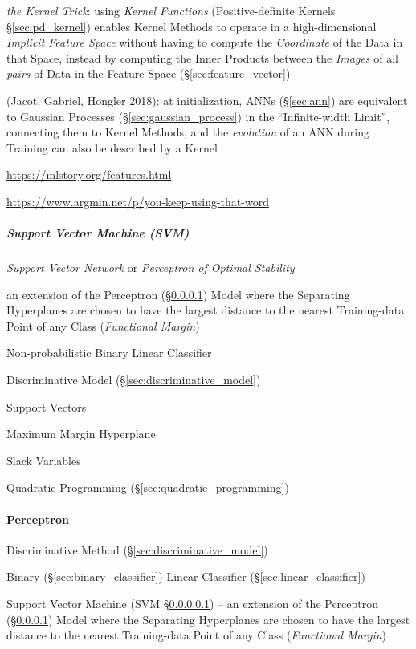 \emph{the Kernel Trick}: using \emph{Kernel Functions} (Positive-definite
Kernels \S\ref{sec:pd_kernel}) enables Kernel Methods to operate in a
high-dimensional \emph{Implicit Feature Space} without having to compute the
\emph{Coordinate} of the Data in that Space, instead by computing the Inner
Products between the \emph{Images} of all \emph{pairs} of Data in the Feature
Space (\S\ref{sec:feature_vector})

(Jacot, Gabriel, Hongler 2018): at initialization, ANNs (\S\ref{sec:ann}) are
equivalent to Gaussian Processes (\S\ref{sec:gaussian_process}) in the
``Infinite-width Limit'', connecting them to Kernel Methods, and the
\emph{evolution} of an ANN during Training can also be described by a Kernel

\url{https://mlstory.org/features.html}

\url{https://www.argmin.net/p/you-keep-using-that-word}



\subparagraph{Support Vector Machine (SVM)}\label{sec:svm}\hfill

\emph{Support Vector Network} or \emph{Perceptron of Optimal Stability}

an extension of the Perceptron (\S\ref{sec:perceptron}) Model where the
Separating Hyperplanes are chosen to have the largest distance to the nearest
Training-data Point of any Class (\emph{Functional Margin})

Non-probabilistic Binary Linear Classifier

Discriminative Model (\S\ref{sec:discriminative_model})

Support Vectors

Maximum Margin Hyperplane

Slack Variables

Quadratic Programming (\S\ref{sec:quadratic_programming})



\paragraph{Perceptron}\label{sec:perceptron}\hfill

Discriminative Method (\S\ref{sec:discriminative_model})

Binary (\S\ref{sec:binary_classifier}) Linear Classifier
(\S\ref{sec:linear_classifier})

\fist Support Vector Machine (SVM \S\ref{sec:svm}) -- an extension of the
Perceptron (\S\ref{sec:perceptron}) Model where the Separating Hyperplanes are
chosen to have the largest distance to the nearest Training-data Point of any
Class (\emph{Functional Margin})

